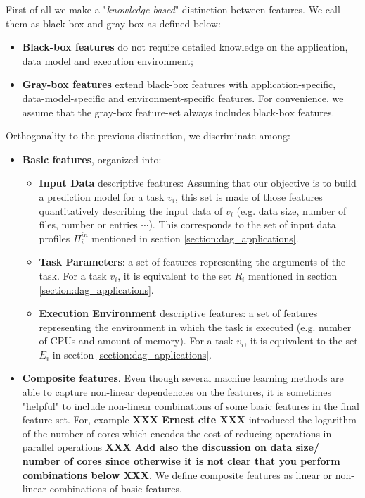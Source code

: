 \documentclass[a4paper, 10pt, conference]{ieeeconf}      %
\begin{document}
First of all we make a "\textit{knowledge-based}" distinction between features. We call them as black-box and gray-box as defined below:
\begin{itemize}
    \item \textbf{Black-box features} do not require detailed knowledge on the application, data model and execution environment;
    \item \textbf{Gray-box features} 
    extend black-box features with application-specific, data-model-specific and environment-specific features. For convenience, we assume that the gray-box feature-set always includes black-box features.
\end{itemize}
Orthogonality to the previous distinction, we discriminate among:
\begin{itemize}
    \item \textbf{Basic features}, organized into:
    \begin{itemize}
        \item \textbf{Input Data} descriptive features: Assuming that our objective is to build a prediction model for a task $v_i$, this set is made of those features quantitatively describing the input data of $v_i$ (e.g. data size, number of files, number or entries $\cdots$). This corresponds to the set of input data profiles $\Pi^{in}_i$ mentioned in section \ref{section:dag_applications}.
        \item \textbf{Task Parameters}: a set of features representing the arguments of the task. For a task $v_i$, it is equivalent to the set $R_i$ mentioned in  section \ref{section:dag_applications}.
        \item \textbf{Execution Environment} descriptive features: a set of features representing the environment in which the task is executed (e.g. number of CPUs and amount of memory). For a task $v_i$, it is equivalent to the set $E_i$ in  section \ref{section:dag_applications}.
    \end{itemize}
    \item \textbf{Composite features}. Even though several machine learning methods are able to capture non-linear dependencies on the features, it is sometimes "helpful" to include non-linear combinations of some basic features in the final feature set. For, example \textbf{XXX Ernest cite XXX} introduced the logarithm of the number of cores which encodes the cost of reducing operations in parallel operations \textbf{XXX Add also the discussion on data size/ number of cores since otherwise it is not clear that you perform combinations below XXX}. We define composite features as linear or non-linear combinations of basic features.
\end{itemize}
\end{document}
